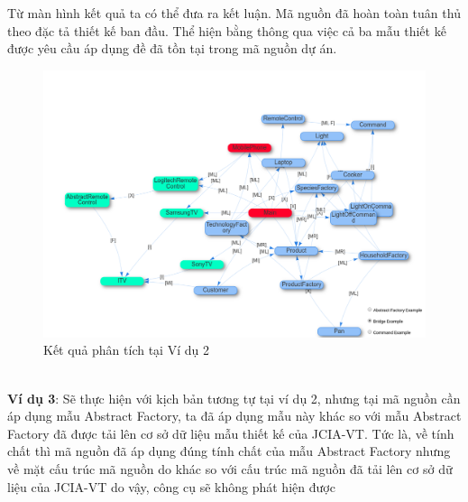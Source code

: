 \documentclass[12pt]{report}
\begin{document}
\noindent Từ màn hình kết quả ta có thể đưa ra kết luận. Mã nguồn đã hoàn toàn tuân thủ theo đặc tả thiết kế ban đầu. Thể hiện bằng thông qua việc cả ba mẫu thiết kế được yêu cầu áp dụng đề đã tồn tại trong mã nguồn dự án.\\
\begin{figure}[!h]
	\vspace{-2.5cm}
	\centering
	\includegraphics[scale=0.35]{images/result_example_1}
	\caption{Kết quả phân tích tại Ví dụ 2}
	\label{fig:result_example_2}
\end{figure}\\
\newpage
\noindent \textbf{Ví dụ 3}: Sẽ thực hiện với kịch bản tương tự tại ví dụ 2, nhưng tại mã nguồn cần áp dụng mẫu Abstract Factory, ta đã áp dụng mẫu này khác so với mẫu Abstract Factory đã được tải lên cơ sở dữ liệu mẫu thiết kế của JCIA-VT. Tức là, về tính chất thì mã nguồn đã áp dụng đúng tính chất của mẫu Abstract Factory nhưng về mặt cấu trúc mã nguồn do khác so với cấu trúc mã nguồn đã tải lên cơ sở dữ liệu của JCIA-VT do vậy, công cụ sẽ không phát hiện được
\end{document}
